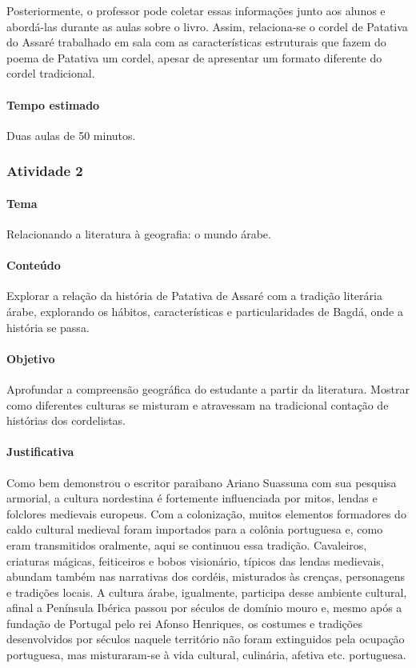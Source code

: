 \documentclass[11pt]{extarticle}
\begin{document}
Posteriormente, o professor pode coletar essas informações junto aos alunos e abordá-las durante as aulas sobre o livro. Assim, relaciona-se o cordel de Patativa do Assaré trabalhado em sala com as características estruturais que fazem do poema de Patativa um cordel, apesar de apresentar um formato diferente do cordel tradicional.


\paragraph{Tempo estimado} Duas aulas de 50 minutos.


\subsubsection{Atividade 2}


\paragraph{Tema} Relacionando a literatura à geografia: o mundo árabe.

\paragraph{Conteúdo} Explorar a relação da história de Patativa de Assaré com a tradição literária árabe, explorando os hábitos, características e particularidades de Bagdá, onde a história se passa.

\paragraph{Objetivo} Aprofundar a compreensão geográfica do estudante a partir da literatura. Mostrar como diferentes culturas se misturam e atravessam na tradicional contação de histórias dos cordelistas. 

\paragraph{Justificativa} Como bem demonstrou o escritor paraibano Ariano Suassuna com sua pesquisa armorial, a cultura nordestina é fortemente influenciada por mitos, lendas e folclores medievais europeus. Com a colonização, muitos elementos formadores do caldo cultural medieval foram importados para a colônia portuguesa e, como eram transmitidos oralmente, aqui se continuou essa tradição. Cavaleiros, criaturas mágicas, feiticeiros e bobos visionário, típicos das lendas medievais, abundam também nas narrativas dos cordéis, misturados às crenças, personagens e tradições locais. A cultura árabe, igualmente, participa desse ambiente cultural, afinal a Península Ibérica passou por séculos de domínio mouro e, mesmo após a fundação de Portugal pelo rei Afonso Henriques, os costumes e tradições desenvolvidos por séculos naquele território não foram extinguidos pela ocupação portuguesa, mas misturaram-se à vida cultural, culinária, afetiva etc. portuguesa.
\end{document}
